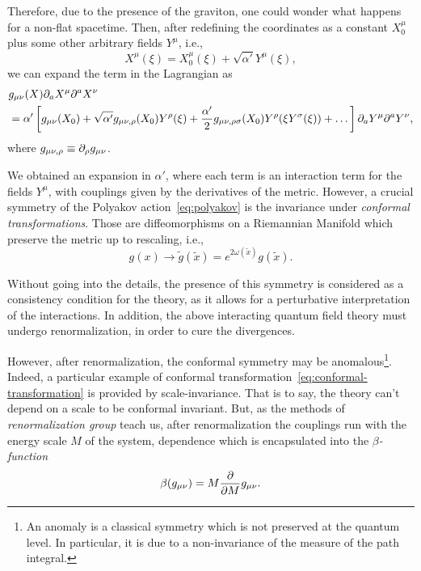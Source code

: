 Therefore, due to the presence of the graviton, one could wonder what happens for a non-flat spacetime. Then, after redefining the coordinates as a constant $X^\mu_0$ plus some other arbitrary fields $Y^\mu$, i.e.,
\begin{equation}
    X^\mu (\xi) = X^\mu_0 (\xi) + \sqrt{\alpha'} Y^\mu (\xi),
\end{equation}
we can expand the term in the Lagrangian as
\begin{equation}\label{eq:expansion-coordinates}
\begin{split}
    &g_{\mu\nu}(X) \partial_a X^\mu \partial^a X^\nu \\
    &= \alpha' \left[ g_{\mu\nu}(X_0) + \sqrt{\alpha'} g_{\mu\nu,\rho}(X_0)Y^\rho(\xi) + \frac{\alpha'}{2} g_{\mu\nu,\rho\sigma}(X_0)Y^\rho(\xi Y^\sigma(\xi)) + \dots \right] \partial_a Y^\mu \partial^a Y^\nu ,
\end{split}
\end{equation}
where $g_{\mu\nu,\rho} \equiv \partial_\rho g_{\mu\nu}$. 

We obtained an expansion in $\alpha'$, where each term is an interaction term for the fields $Y^\mu$, with couplings given by the derivatives of the metric. However, a crucial symmetry of the Polyakov action~\eqref{eq:polyakov} is the invariance under \emph{conformal transformations}. Those are diffeomorphisms on a Riemannian Manifold which preserve the metric up to rescaling, i.e.,
\begin{equation}\label{eq:conformal-transformation}
    g(x) \to \tilde{g}(\tilde{x}) = e^{2\omega(\tilde{x})} g(\tilde{x}).
\end{equation}

Without going into the details, the presence of this symmetry is considered as a consistency condition for the theory, as it allows for a perturbative interpretation of the interactions. In addition, the above interacting quantum field theory must undergo renormalization, in order to cure the divergences. 

However, after renormalization, the conformal symmetry may be anomalous\footnote{An anomaly is a classical symmetry which is not preserved at the quantum level. In particular, it is due to a non-invariance of the measure of the path integral.}. Indeed, a particular example of conformal transformation~\eqref{eq:conformal-transformation} is provided by scale-invariance. That is to say, the theory can't depend on a scale to be conformal invariant. But, as the methods of \emph{renormalization group} teach us, after renormalization the couplings run with the energy scale $M$ of the system, dependence which is encapsulated into the \emph{$\beta$-function}
\begin{equation}
    \beta(g_{\mu\nu}) = M \frac{\partial}{\partial M} g_{\mu\nu}.
\end{equation}

